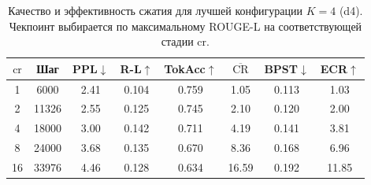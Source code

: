 \begin{table}[ht]
\centering
\caption{Качество и эффективность сжатия для лучшей конфигурации $K=4$ (d4). Чекпоинт выбирается по максимальному ROUGE-L на соответствующей стадии $\text{cr}$.}
\label{tab:compression-efficiency}
\footnotesize
\begin{tabular}{cccccccc}
\toprule
$\text{cr}$ & Шаг & PPL$\downarrow$ & R-L$\uparrow$ & TokAcc$\uparrow$ & $\overline{\mathrm{CR}}$ & BPST$\downarrow$ & ECR$\uparrow$ \\
\midrule
1 & 6000 & 2.41 & 0.104 & 0.759 & 1.05 & 0.113 & 1.03 \\
2 & 11326 & 2.55 & 0.125 & 0.745 & 2.10 & 0.120 & 2.00 \\
4 & 18000 & 3.00 & 0.142 & 0.711 & 4.19 & 0.141 & 3.81 \\
8 & 24000 & 3.68 & 0.135 & 0.670 & 8.36 & 0.168 & 6.96 \\
16 & 33976 & 4.46 & 0.128 & 0.634 & 16.59 & 0.192 & 11.85 \\
\bottomrule
\end{tabular}
\end{table}

